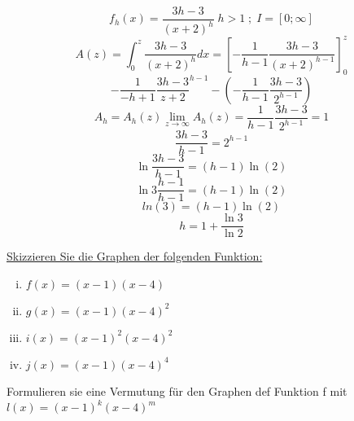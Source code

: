 \documentclass{book}
\begin{document}
\[f_h(x) = \frac{3h-3}{(x+2)^h} \; h > 1 \; ; \; I = [0;\infty]\]
\[A(z) = \int_0^z \frac{3h-3}{(x+2)^h} dx = [-\frac 1 {h-1}\frac{3h-3}{(x+2)^{h-1}}]_0^z \]
\[ - \frac 1 {-h+1} \frac {3h-3}{z+2}^{h-1} - (-\frac 1{h-1} \frac {3h-3}{2^{h-1}})\]
\[A_h = A_h(z) \lim_{z\to\infty}A_h(z)=\frac 1 {h-1} \frac {3h-3}{2^{h-1}} = 1 \]
\[\frac {3h-3}{h-1} = 2^{h-1}\]
\[\ln \frac{3h-3}{h-1} = (h-1)\ln(2)\]
\[\ln 3\frac{h-1}{h-1}=(h-1)\ln(2)\]
\[ln (3) = (h-1)\ln(2)\]
\[h = 1+ \frac {\ln3}{\ln2}\]


\underline{Skizzieren Sie die Graphen der folgenden Funktion:}
\begin{enumerate}[i)]
    \item $f(x) = (x-1)(x-4)$
    \item $g(x) = (x-1)(x-4)^2$
    \item $i(x) = (x-1)^2(x-4)^2$
    \item $j(x) = (x-1)(x-4)^4$

\end{enumerate}



Formulieren sie eine Vermutung für den Graphen def Funktion f mit $ l(x) = (x-1)^k(x-4)^m$
\end{document}
